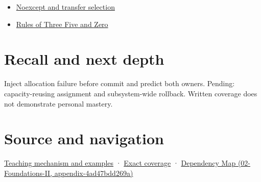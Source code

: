 \begin{itemize}
\tightlist
\item
  \hyperref[appendix-c746afaa47d1]{Noexcept and transfer selection}
\item
  \hyperref[appendix-7679107d057e]{Rules of Three Five and Zero}
\end{itemize}

\section{Recall and next depth}\label{appendix-bea6beb5350f-recall-and-next-depth}

Inject allocation failure before commit and predict both owners. Pending: capacity-reusing assignment and subsystem-wide rollback. Written coverage does not demonstrate personal mastery.

\section{Source and navigation}\label{appendix-bea6beb5350f-source-and-navigation}

\href{Continuous\%20Notes/Computing\%20Foundations\%20-\%20From\%20Bits\%20to\%20C++\%20and\%20Systems\%20APIs\#Replacing\%20a\%20value\%20is\%20not\%20creating\%20an\%20object}{Teaching mechanism and examples} · \hyperref[appendix-fd090d982a15-m009---parts-127-147]{Exact coverage} · \href{../02-Foundations-II/main.pdf\#nameddest=appendix-4ad47bdd269a}{Dependency Map (02-Foundations-II, appendix-4ad47bdd269a)}
